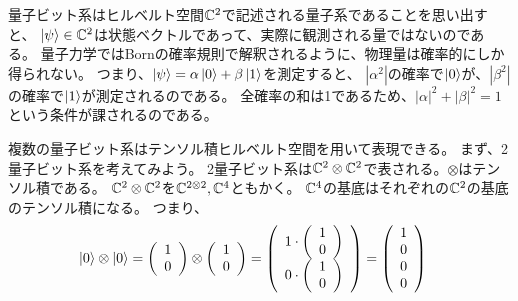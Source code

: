 量子ビット系はヒルベルト空間$\mathbb{C}^2$で記述される量子系であることを思い出すと、
$\ket{\psi}\in\mathbb{C}^2$は状態ベクトルであって、実際に観測される量ではないのである。
量子力学ではBornの確率規則で解釈されるように、物理量は確率的にしか得られない。
つまり、$\ket{\psi} = \alpha\ket{0}+\beta\ket{1}$を測定すると、
$|\alpha^2|$の確率で$\ket{0}$が、$|\beta^2|$の確率で$\ket{1}$が測定されるのである。
全確率の和は1であるため、$|\alpha|^2 + |\beta|^2 = 1$という条件が課されるのである。

複数の量子ビット系はテンソル積ヒルベルト空間を用いて表現できる。
まず、2量子ビット系を考えてみよう。
2量子ビット系は$\mathbb{C}^2\otimes\mathbb{C}^2$で表される。$\otimes$はテンソル積である。
$\mathbb{C}^2\otimes\mathbb{C}^2$を$\mathbb{C}^{2\otimes 2},\mathbb{C}^4$ともかく。
$\mathbb{C}^4$の基底はそれぞれの$\mathbb{C}^2$の基底のテンソル積になる。
つまり、
\begin{align} %
  \ket{0}\otimes\ket{0} &=
  \left(
    \begin{array}{c}
      1\\
      0
    \end{array}
  \right)
  \otimes
  \left(
    \begin{array}{c}
      1\\
      0
    \end{array}
  \right)
  =
  \left(
  \begin{array}{c}
    1 \cdot \left(
              \begin{array}{c}
                1\\
                0
              \end{array}
            \right)\\
    0 \cdot \left(
              \begin{array}{c}
                1\\
                0
              \end{array}
            \right)\\
    \end{array}
  \right)
  =
  \left(
    \begin{array}{c}
      1\\
      0\\
      0\\
      0
    \end{array}
  \right)
\end{align}

